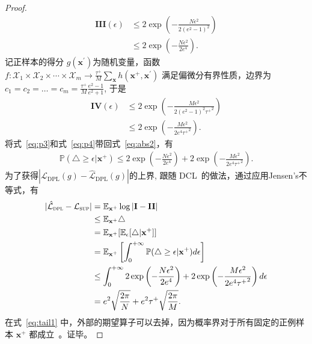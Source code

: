 \begin{lemma}
\begin{proof}
		\begin{align}
			\mathbf{III}(\epsilon)  
			&\leq 2\exp \left(-\frac{N\epsilon^2}{2(e^2-1)^2} \right)  \\
			&\leq 2\exp \left(-\frac{N\epsilon^2}{2e^4} \right).\label{eq:p3}
		\end{align}
		记正样本的得分 $g(\mathbf{x}^\prime)$为随机变量，函数$f:{\mathcal {X}}_{1}\times {\mathcal {X}}_{2}\times \cdots \times {\mathcal {X}}_{m}\rightarrow \frac{\tau^+}{M} \sum_{\mathbf{x}}  h(\mathbf{x}^+,\mathbf{x}^\prime) $ 满足偏微分有界性质，边界为 ${\displaystyle c_{1}=c_{2}=\dots =c_{m}} = \frac{\tau^+}{M}\frac{e^2-1}{e^2+1}$, 于是
		\begin{align}
			\mathbf{IV}(\epsilon)  
			&\leq 2\exp \left(-\frac{M\epsilon^2}{2(e^2-1)^2{\tau^+}^2} \right)  \\
			&\leq 2\exp \left(-\frac{M\epsilon^2}{2e^4{\tau^+}^2}  \right).\label{eq:p4}
		\end{align}
将式~\eqref{eq:p3}和式~\eqref{eq:p4}带回式~\eqref{eq:abs2}，有
		\begin{align}
			\mathbb{P}(\triangle \geq \epsilon|\mathbf{x}^+) \leq 2\exp \left(-\frac{N\epsilon^2}{2e^4} \right)+2\exp \left(-\frac{M\epsilon^2}{2e^4{\tau^+}^2}  \right). \label{eq:tail}
		\end{align}
为了获得$|\mathcal{L}_{\text{DPL}}(g) - \hat{\mathcal{L}}_\text{DPL}(g)| $的上界, 跟随 DCL~\cite{Chuang:2020:NIPS}的做法，通过应用Jensen's不等式，有
		\begin{align}
			|\hat{\mathcal{L}}_\textsc{dpl}-\mathcal{L}_\textsc{sup}|
			&=\mathbb{E}_{\mathbf{x}^+} \log | \mathbf{I} - \mathbf{II}| \\
			&\leq \mathbb{E}_{\mathbf{x}^+} \triangle\\
			&=  \mathbb{E}_{\mathbf{x}^+} [\mathbb{E}_\epsilon[\triangle|\mathbf{x}^+]] \\
			&=  \mathbb{E}_{\mathbf{x}^+} \left[\int_{0}^{+\infty} \mathbb{P}(\triangle \geq \epsilon|\mathbf{x}^+)d\epsilon \right] \label{eq:tail1} \\
			&\leq \int_{0}^{+\infty}  2\exp \left(-\frac{N\epsilon^2}{2e^4} \right)+2\exp \left(-\frac{M\epsilon^2}{2e^4{\tau^+}^2}  \right) d \epsilon \nonumber\\
			&= e^2\sqrt{\frac{2\pi}{N}} + e^2\tau^+\sqrt{\frac{2\pi}{M}}.
		\end{align}
在式~\eqref{eq:tail1} 中，外部的期望算子可以去掉，因为概率界对于所有固定的正例样本 $\mathbf{x}^+$ 都成立~\cite{Chuang:2020:NIPS}。证毕。
	\end{proof}
\end{lemma}

